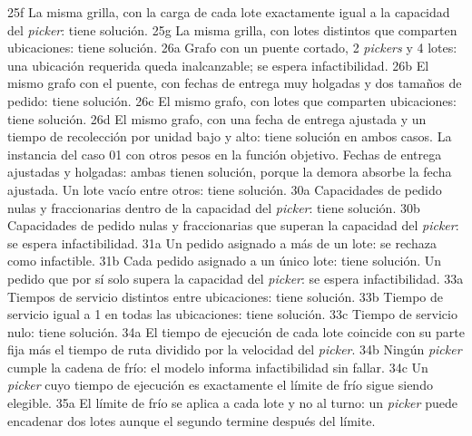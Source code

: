 	\bTR \bTD 25f \eTD \bTD La misma grilla, con la carga de cada lote exactamente igual a la capacidad del {\em picker}: tiene solución. \eTD \eTR
	\bTR \bTD 25g \eTD \bTD La misma grilla, con lotes distintos que comparten ubicaciones: tiene solución. \eTD \eTR
	\bTR \bTD 26a \eTD \bTD Grafo con un puente cortado, 2 {\em pickers} y 4 lotes: una ubicación requerida queda inalcanzable; se espera infactibilidad. \eTD \eTR
	\bTR \bTD 26b \eTD \bTD El mismo grafo con el puente, con fechas de entrega muy holgadas y dos tamaños de pedido: tiene solución. \eTD \eTR
	\bTR \bTD 26c \eTD \bTD El mismo grafo, con lotes que comparten ubicaciones: tiene solución. \eTD \eTR
	\bTR \bTD 26d \eTD \bTD El mismo grafo, con una fecha de entrega ajustada y un tiempo de recolección por unidad bajo y alto: tiene solución en ambos casos. \eTD \eTR
	\bTR {} \eTD \bTD La instancia del caso 01 con otros pesos en la función objetivo. \eTD \eTR
	\bTR {} \eTD \bTD Fechas de entrega ajustadas y holgadas: ambas tienen solución, porque la demora absorbe la fecha ajustada. \eTD \eTR
	\bTR {} \eTD \bTD Un lote vacío entre otros: tiene solución. \eTD \eTR
	\bTR \bTD 30a \eTD \bTD Capacidades de pedido nulas y fraccionarias dentro de la capacidad del {\em picker}: tiene solución. \eTD \eTR
	\bTR \bTD 30b \eTD \bTD Capacidades de pedido nulas y fraccionarias que superan la capacidad del {\em picker}: se espera infactibilidad. \eTD \eTR
	\bTR \bTD 31a \eTD \bTD Un pedido asignado a más de un lote: se rechaza como infactible. \eTD \eTR
	\bTR \bTD 31b \eTD \bTD Cada pedido asignado a un único lote: tiene solución. \eTD \eTR
	\bTR {} \eTD \bTD Un pedido que por sí solo supera la capacidad del {\em picker}: se espera infactibilidad. \eTD \eTR
	\bTR \bTD 33a \eTD \bTD Tiempos de servicio distintos entre ubicaciones: tiene solución. \eTD \eTR
	\bTR \bTD 33b \eTD \bTD Tiempo de servicio igual a 1 en todas las ubicaciones: tiene solución. \eTD \eTR
	\bTR \bTD 33c \eTD \bTD Tiempo de servicio nulo: tiene solución. \eTD \eTR
	\bTR \bTD 34a \eTD \bTD El tiempo de ejecución de cada lote coincide con su parte fija más el tiempo de ruta dividido por la velocidad del {\em picker}. \eTD \eTR
	\bTR \bTD 34b \eTD \bTD Ningún {\em picker} cumple la cadena de frío: el modelo informa infactibilidad sin fallar. \eTD \eTR
	\bTR \bTD 34c \eTD \bTD Un {\em picker} cuyo tiempo de ejecución es exactamente el límite de frío sigue siendo elegible. \eTD \eTR
	\bTR \bTD 35a \eTD \bTD El límite de frío se aplica a cada lote y no al turno: un {\em picker} puede encadenar dos lotes aunque el segundo termine después del límite. \eTD \eTR

